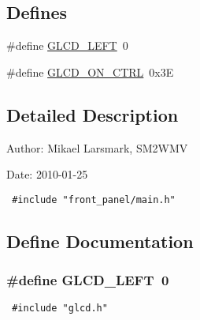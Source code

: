 \subsection*{Defines}
\begin{CompactItemize}
\item 
\#define \hyperlink{group__front__panel__group_g4a20e62f00af437f0751229dbe5f155c}{GLCD\_\-LEFT}~0
\item 
\#define \hyperlink{group__front__panel__group_gc713332b9d7760dbb16cc1e670405c5d}{GLCD\_\-ON\_\-CTRL}~0x3E
\end{CompactItemize}


\subsection{Detailed Description}
\begin{Desc}
\item[Author:]Mikael Larsmark, SM2WMV \end{Desc}
\begin{Desc}
\item[Date:]2010-01-25 

\begin{Code}\begin{verbatim} #include "front_panel/main.h" 
\end{verbatim}
\end{Code}

 \end{Desc}


\subsection{Define Documentation}
\hypertarget{group__front__panel__group_g4a20e62f00af437f0751229dbe5f155c}{
\subsubsection[{GLCD\_\-LEFT}]{\setlength{\rightskip}{0pt plus 5cm}\#define GLCD\_\-LEFT~0}}
\label{group__front__panel__group_g4a20e62f00af437f0751229dbe5f155c}




\begin{Code}\begin{verbatim} #include "glcd.h" 
\end{verbatim}
\end{Code}

